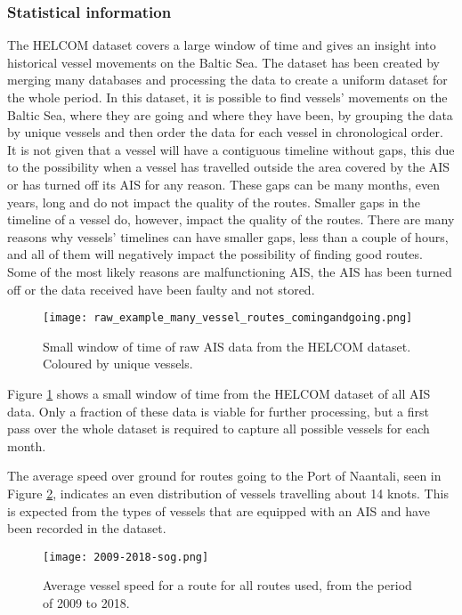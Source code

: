 \documentclass[../main.tex]{subfiles}
\begin{document}
\subsubsection{Statistical information}
\label{sec:AIS-stat}
The HELCOM dataset covers a large window of time and gives an insight into historical vessel movements on the Baltic Sea. The dataset has been created by merging many databases and processing the data to create a uniform dataset for the whole period. In this dataset, it is possible to find vessels' movements on the Baltic Sea, where they are going and where they have been, by grouping the data by unique vessels and then order the data for each vessel in chronological order. It is not given that a vessel will have a contiguous timeline without gaps, this due to the possibility when a vessel has travelled outside the area covered by the AIS or has turned off its AIS for any reason. These gaps can be many months, even years, long and do not impact the quality of the routes. Smaller gaps in the timeline of a vessel do, however, impact the quality of the routes. There are many reasons why vessels' timelines can have smaller gaps, less than a couple of hours, and all of them will negatively impact the possibility of finding good routes. Some of the most likely reasons are malfunctioning AIS, the AIS has been turned off or the data received have been faulty and not stored.

\begin{figure}[H]
	\centering
	\texttt{[image: raw\_example\_many\_vessel\_routes\_comingandgoing.png]}
	\caption{Small window of time of raw AIS data from the HELCOM dataset. Coloured by unique vessels.}
	\label{fig:raw-ais-data}
\end{figure}

Figure \ref{fig:raw-ais-data} shows a small window of time from the HELCOM dataset of all AIS data. Only a fraction of these data is viable for further processing, but a first pass over the whole dataset is required to capture all possible vessels for each month.

The average speed over ground for routes going to the Port of Naantali, seen in Figure \ref{fig:sog-dist}, indicates an even distribution of vessels travelling about 14 knots. This is expected from the types of vessels that are equipped with an AIS and have been recorded in the dataset.

\begin{figure}[H]
	\centering
	\texttt{[image: 2009-2018-sog.png]}
	\caption{Average vessel speed for a route for all routes used, from the period of 2009 to 2018.}
	\label{fig:sog-dist}
\end{figure}
\end{document}
